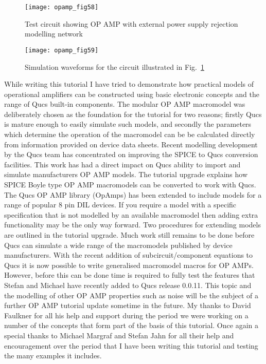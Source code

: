 \begin{figure} 
  \centering 
  \texttt{[image: opamp\_fig58]}
  \caption{Test circuit showing OP AMP with external power supply rejection modelling network}   
  \label{fig:opamp58}
\end{figure}

\begin{figure} 
  \centering 
  \texttt{[image: opamp\_fig59]}
  \caption{Simulation waveforms for the circuit illustrated in Fig.~\ref{fig:opamp58}}  
  \label{fig:opamp59}
\end{figure}







While writing this tutorial I have tried to demonstrate how practical models of operational amplifiers can be constructed using basic electronic concepts and the range of Qucs built-in components.  The modular OP AMP macromodel was deliberately chosen as the foundation for the tutorial for two reasons; firstly Qucs is mature enough to easily simulate such models, and secondly the parameters which determine the operation of the macromodel can be be calculated directly from information provided on device data sheets. Recent modelling development by the Qucs team has concentrated on improving the SPICE to Qucs conversion facilities. This work has had a direct impact on Qucs ability to import and simulate manufacturers OP AMP models. The tutorial upgrade explains how SPICE Boyle type OP AMP macromodels can be converted to work with Qucs. The Qucs OP AMP library (OpAmps) has been extended to include models for a range of popular 8 pin DIL devices. If you require a model with a specific specification that is not modelled by an available macromodel then adding extra functionality may be the only way forward.  Two procedures for extending models are outlined in the tutorial upgrade. Much work still remains to be done before Qucs can simulate a wide range of the macromodels published by device manufacturers.  With the recent addition of subcircuit/component equations to Qucs it is now possible to write generalised macromodel macros for OP AMPs.  However, before this can be done time is required to fully test the features that Stefan and Michael have recently added to Qucs release 0.0.11. This topic and the modelling of other OP AMP properties such as noise will be the subject of a further OP AMP tutorial update sometime in the future.  My thanks to David Faulkner for all his help and support during the period we were working on a number of the concepts that form part of the basis of this tutorial. Once again a special thanks to Michael Margraf and Stefan Jahn for all their help and encouragement over the period that I have been writing this tutorial and testing the many examples it includes.